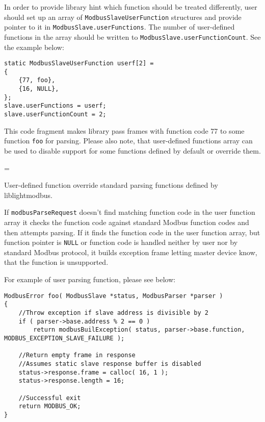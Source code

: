 \documentclass[11pt,a4paper]{article}
\newenvironment{warning}
{
	\par\begin{mdframed}[linewidth=0.5pt,linecolor=black]%
	\begin{list}{}{\leftmargin=1cm
	\labelwidth=\leftmargin}\item[\Large\ding{43}]
}
{	
	\end{list}\end{mdframed}\par
}
\newcommand{\warnbox}[1]{\vspace{0.2cm}\begin{warning}{#1}\end{warning}\vspace{0.2cm}}
\begin{document}
In order to provide library hint which function should be treated differently, user should set up an array of \texttt{ModbusSlaveUserFunction} structures and provide pointer to it in \texttt{ModbusSlave.userFunctions}. The number of user-defined functions in the array should be written to \texttt{ModbusSlave.userFunctionCount}. See the example below:

\begin{lstlisting}[style=cstyle]
static ModbusSlaveUserFunction userf[2] =
{
	{77, foo},
	{16, NULL},
};
slave.userFunctions = userf;
slave.userFunctionCount = 2;
\end{lstlisting}

This code fragment makes library pass frames with function code 77 to some function \texttt{foo} for parsing. Please also note, that user-defined functions array can be used to disable support for some functions defined by default or override them.

\warnbox{User-defined function override standard parsing functions defined by liblightmodbus.}

If \texttt{modbusParseRequest} doesn't find matching function code in the user function array it checks the function code against standard Modbus function codes and then attempts parsing.
If it finds the function code in the user function array, but function pointer is \texttt{NULL} or function code is handled neither by user nor by standard Modbus protocol, it builds exception frame letting master device know, that the function is unsupported.\newline


For example of user parsing function, please see below:
\begin{lstlisting}[style=cstyle]
ModbusError foo( ModbusSlave *status, ModbusParser *parser )
{
	//Throw exception if slave address is divisible by 2
	if ( parser->base.address % 2 == 0 ) 
		return modbusBuilException( status, parser->base.function, MODBUS_EXCEPTION_SLAVE_FAILURE );
	
	//Return empty frame in response
	//Assumes static slave response buffer is disabled
	status->response.frame = calloc( 16, 1 );
	status->response.length = 16;

	//Successful exit	
	return MODBUS_OK;
}
\end{lstlisting}
\end{document}
